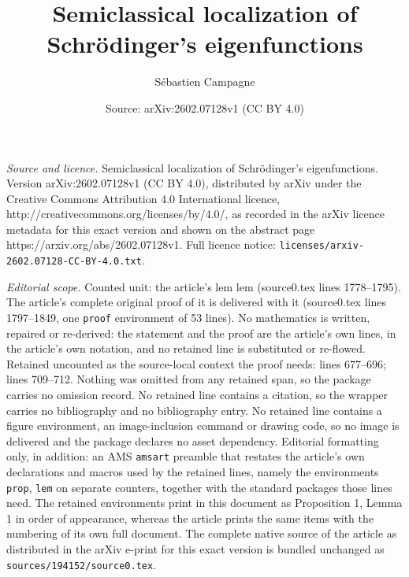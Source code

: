 \documentclass[10pt,a4paper]{amsart}
\title{Semiclassical localization of Schrödinger's eigenfunctions}
\author{S\'ebastien Campagne}
\date{Source: arXiv:2602.07128v1 (CC BY 4.0)}
\begin{document}
\maketitle

\noindent\emph{Source and licence.} Semiclassical localization of Schrödinger's eigenfunctions. Version arXiv:2602.07128v1 (CC BY 4.0), distributed by arXiv under the Creative Commons Attribution 4.0 International licence, http://creativecommons.org/licenses/by/4.0/, as recorded in the arXiv licence metadata for this exact version and shown on the abstract page https://arxiv.org/abs/2602.07128v1. Full licence notice: \texttt{licenses/arxiv-2602.07128-CC-BY-4.0.txt}.\par\smallskip

\noindent\textit{Editorial scope.} Counted unit: the article's lem lem (source0.tex lines 1778--1795). The article's complete original proof of it is delivered with it (source0.tex lines 1797--1849, one \texttt{proof} environment of 53 lines). No mathematics is written, repaired or re-derived: the statement and the proof are the article's own lines, in the article's own notation, and no retained line is substituted or re-flowed.  Retained uncounted as the source-local context the proof needs: lines 677--696; lines 709--712.  Nothing was omitted from any retained span, so the package carries no omission record.  No retained line contains a citation, so the wrapper carries no bibliography and no bibliography entry.  No retained line contains a figure environment, an image-inclusion command or drawing code, so no image is delivered and the package declares no asset dependency.  Editorial formatting only, in addition: an AMS \texttt{amsart} preamble that restates the article's own declarations and macros used by the retained lines, namely the environments \texttt{prop}, \texttt{lem} on separate counters, together with the standard packages those lines need.  The retained environments print in this document as Proposition 1, Lemma 1 in order of appearance, whereas the article prints the same items with the numbering of its own full document.  The complete native source of the article as distributed in the arXiv e-print for this exact version is bundled unchanged as \texttt{sources/194152/source0.tex}.
\end{document}
